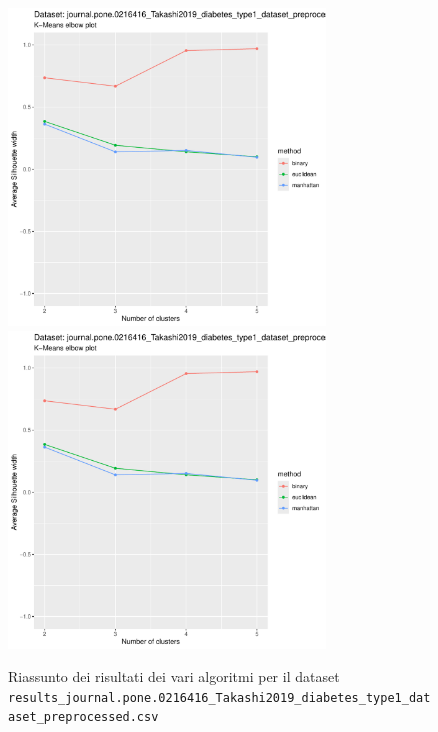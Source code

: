 \documentclass[12pt]{report}
\begin{document}
			\begin{figure}[h]
				\centering
				\includegraphics[width = 0.75\textwidth, height = 0.45\textheight, page = 9]{
					results/results_journal.pone.0216416_Takashi2019_diabetes_type1_dataset_preprocessed.csv.pdf
				}
				\includegraphics[width = 0.75\textwidth, height = 0.45\textheight, page = 10]{
					results/results_journal.pone.0216416_Takashi2019_diabetes_type1_dataset_preprocessed.csv.pdf
				}
				\caption{Riassunto dei risultati dei vari algoritmi per il dataset
				\texttt{results\_journal.pone.0216416\_Takashi2019\_diabetes\_type1\_dataset\_preprocessed.csv}}
				\label{fig:comp4}
			\end{figure}
\end{document}
